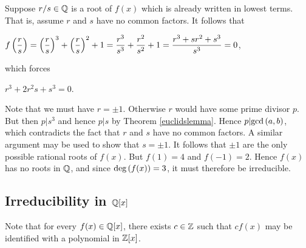 \documentclass[11pt,fleqn,dvipsnames,usenames]{article}
\newcommand{\p}{\noindent}
\begin{document}
\begin{examples}
\begin{enumerate}[(a)]
\p Suppose $r/s\in \mathbb{Q}$ is a root of $f(x)$ which is already written in lowest terms.  That is, assume $r$ and $s$ have no common factors.  It follows that
\begin{center}
$\displaystyle{f\left(\frac{r}{s}\right) = \left(\frac{r}{s}\right)^3 + \left(\frac{r}{s}\right)^2 + 1 = \frac{r^3}{s^3} + \frac{r^2}{s^2} + 1 = \frac{r^3 + sr^2 + s^3}{s^3} = 0}$,
\end{center}
which forces
\begin{center}
$r^3 + 2r^2s + s^3 = 0$.
\end{center}
Note that we must have $r = \pm 1$.  Otherwise $r$ would have some prime divisor $p$.  But then $p|s^3$ and hence $p|s$ by Theorem \ref{euclidslemma}.  Hence $p|\text{gcd}\left(a,b\right)$, which contradicts the fact that $r$ and $s$ have no common factors.  A similar argument may be used to show that $s = \pm 1$.  It follows that $\pm 1$ are the only possible rational roots of $f(x)$.  But $f(1) = 4$ and $f(-1) = 2$.  Hence $f(x)$ has no roots in $\mathbb{Q}$, and since $\text{deg}\left(f(x)\right) = 3$, it must therefore be irreducible.
\end{enumerate}
\end{examples}

\subsection{Irreducibility in \texorpdfstring{$\mathbb{Q}[x]$}{Q[x]}}

\p Note that for every $f(x)\in \mathbb{Q}[x]$, there exists $c\in\mathbb{Z}$ such that $cf(x)$ may be identified with a polynomial in $\mathbb{Z}[x]$.
\vsp
\end{document}
